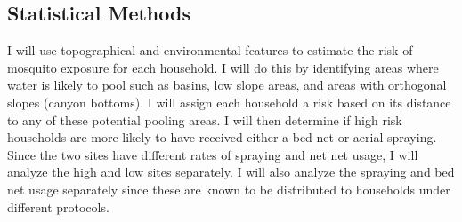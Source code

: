 \documentclass{article}\usepackage[]{graphicx}\usepackage[]{color}
\begin{document}
\FloatBarrier

\subsection{Statistical Methods}
I will use topographical and environmental features to estimate the risk of mosquito exposure for each household.  I will do this by identifying areas where water is likely to pool such as basins, low slope areas, and areas with orthogonal slopes (canyon bottoms).  I will assign each household a risk based on its distance to any of these potential pooling areas.  I will then determine if high risk households are more likely to have received either a bed-net or aerial spraying.\\
Since the two sites have different rates of spraying and net net usage, I will analyze the high and low sites separately.  I will also analyze the spraying and bed net usage separately since these are known to be distributed to households under different protocols.\\
\end{document}
